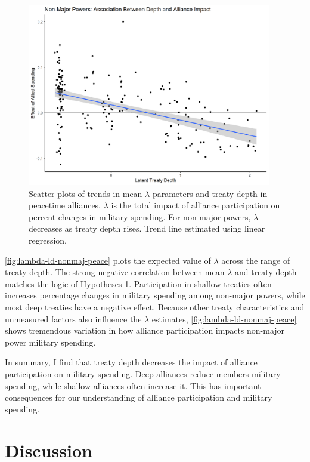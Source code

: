 \documentclass[12pt]{article}
\begin{document}
\begin{figure}[htbp]
	\centering
		\includegraphics[width=0.95\textwidth]{../figures/lambda-ld-nonmaj.png}
	\caption{Scatter plots of trends in mean $\lambda$ parameters and treaty depth in peacetime alliances. $\lambda$ is the total impact of alliance participation on percent changes in military spending. For non-major powers, $\lambda$ decreases as treaty depth rises. Trend line estimated using linear regression.}
	\label{fig:lambda-ld-nonmaj-peace}
\end{figure}


\autoref{fig:lambda-ld-nonmaj-peace} plots the expected value of $\lambda$ across the range of treaty depth. 
The strong negative correlation between mean $\lambda$ and treaty depth matches the logic of Hypotheses 1. 
Participation in shallow treaties often increases percentage changes in military spending among non-major powers, while most deep treaties have a negative effect. 
Because other treaty characteristics and unmeasured factors also influence the $\lambda$ estimates, \autoref{fig:lambda-ld-nonmaj-peace} shows tremendous variation in how alliance participation impacts non-major power military spending. 


In summary, I find that treaty depth decreases the impact of alliance participation on military spending. 
Deep alliances reduce members military spending, while shallow alliances often increase it. 
This has important consequences for our understanding of alliance participation and military spending. 



\section*{Discussion}
\end{document}
